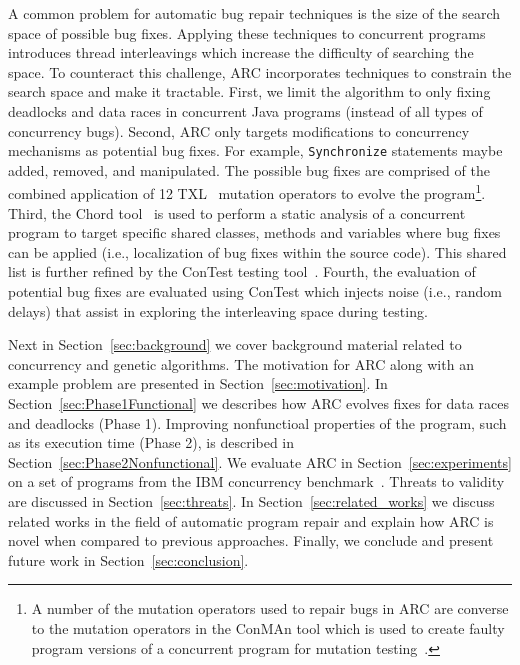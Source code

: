 \documentclass[runningheads,a4paper]{llncs}
\begin{document}
A common problem for automatic bug repair techniques is the size of the search space of possible bug fixes. Applying these techniques to  concurrent programs introduces thread interleavings which increase the difficulty of searching the space. To counteract this challenge, ARC incorporates techniques to constrain the search space and make it tractable. First, we limit the algorithm to only fixing deadlocks and data races in concurrent Java programs (instead of all types of concurrency bugs). Second, ARC only targets modifications to concurrency mechanisms as potential bug fixes. For example, \texttt{Synchronize} statements maybe added, removed, and manipulated. The possible bug fixes are comprised of the combined application of 12 TXL~\cite{CHP91} mutation operators to evolve the program\footnote{A number of the mutation operators used to repair bugs in ARC are converse to the mutation operators in the ConMAn tool which is used to create faulty program versions of a concurrent program for mutation testing~\cite{BCD06}.}.  Third, the Chord tool~\cite{NA07} is used to perform a static analysis of a concurrent program to target specific shared classes, methods and variables where bug fixes can be applied (i.e., localization of bug fixes within the source code). This shared list is further refined by the ConTest testing tool~\cite{EFN+02}. Fourth, the evaluation of potential bug fixes are evaluated using ConTest which injects noise (i.e., random delays) that assist in exploring the interleaving space during testing. 


Next in Section~\ref{sec:background} we cover background material related to concurrency and genetic algorithms. The motivation for ARC along with an example problem are presented in Section~\ref{sec:motivation}. In Section~\ref{sec:Phase1Functional} we describes how ARC evolves fixes for data races and deadlocks (Phase 1). Improving nonfunctioal properties of the program, such as its execution time (Phase 2), is described in Section~\ref{sec:Phase2Nonfunctional}. We evaluate ARC in Section~\ref{sec:experiments} on a set of programs from the IBM concurrency benchmark~\cite{HSU03, EU04, ETU08}. Threats to validity are discussed in Section~\ref{sec:threats}. In Section~\ref{sec:related_works} we discuss related works in the field of automatic program repair and explain how ARC is novel when compared to previous approaches. Finally, we conclude and present future work in Section~\ref{sec:conclusion}.
\end{document}
